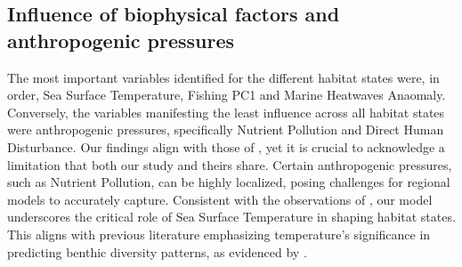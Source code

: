 \begin{refsection}
\hypertarget{influence-of-biophysical-factors-and-anthropogenic-pressures}{%
\subsection{Influence of biophysical factors and anthropogenic
pressures}\label{influence-of-biophysical-factors-and-anthropogenic-pressures}}

The most important variables identified for the different habitat states
were, in order, Sea Surface Temperature, Fishing PC1 and Marine
Heatwaves Anaomaly. Conversely, the variables manifesting the least
influence across all habitat states were anthropogenic pressures,
specifically Nutrient Pollution and Direct Human Disturbance. Our
findings align with those of \textcite{Jouffray_2019}, yet it is crucial
to acknowledge a limitation that both our study and theirs share.
Certain anthropogenic pressures, such as Nutrient Pollution, can be
highly localized, posing challenges for regional models to accurately
capture. Consistent with the observations of \textcite{Jouffray_2019},
our model underscores the critical role of Sea Surface Temperature in
shaping habitat states. This aligns with previous literature emphasizing
temperature's significance in predicting benthic diversity patterns, as
evidenced by \textcite{Belanger_2012}.


\end{refsection}
